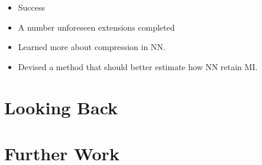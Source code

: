 \documentclass[dissertation.tex]{subfiles}
\begin{document}
\begin{itemize}
  \item{
      Success
    }
  \item{
      A number unforeseen extensions completed
    }
  \item{
      Learned more about compression in NN.
    }
  \item{
      Devised a method that should better estimate how NN retain MI.
    }
\end{itemize}

\section{Looking Back}


\section{Further Work}
\end{document}
